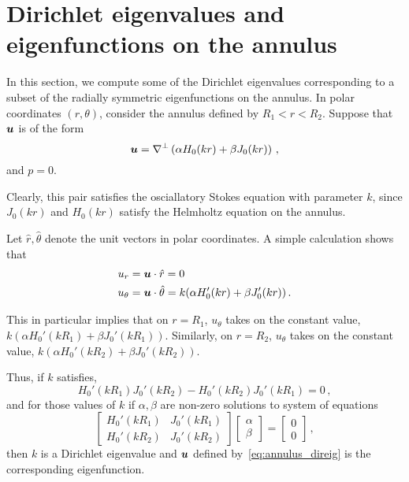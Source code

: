 \section{Dirichlet eigenvalues and eigenfunctions on the annulus \label{sec:annul_dir_exact}}
In this section, we compute some of the Dirichlet eigenvalues
corresponding to a subset of the radially symmetric eigenfunctions
on the annulus. 
In polar coordinates $(r,\theta)$, consider the annulus defined by 
$R_{1}<r<R_{2}$. 
Suppose that ${\boldsymbol u}$ is of the form 
\begin{equation}
{\boldsymbol u} = \nabla^{\perp}\left( \alpha H_{0}(kr) + \beta J_{0}(kr) \right) \, ,
\label{eq:annulus_direig}
\end{equation}
and $p=0$.

Clearly, this pair satisfies the osciallatory Stokes equation
with parameter $k$, since $J_{0}(kr)$ and $H_{0}(kr)$ 
satisfy the Helmholtz equation on the annulus.

Let $\hat{r},\hat{\theta}$ denote the unit vectors in polar coordinates.
A simple calculation shows that 
\begin{equation}
\begin{aligned}
u_{r} &= {\boldsymbol u} \cdot \hat{r}  = 0 \, \\
u_{\theta} &= {\boldsymbol u} \cdot \hat{\theta} = k(\alpha  H_{0}'(kr) + \beta J_{0}'(kr)) \, .
\end{aligned}
\end{equation}

This in particular implies that on $r=R_{1}$,
$u_{\theta}$ takes on the constant value,
$k(\alpha H_{0}'(kR_{1}) + \beta J_{0}'(kR_{1}))$.
Similarly, on $r=R_{2}$, 
$u_{\theta}$ takes on the constant value,
$k(\alpha H_{0}'(kR_{2}) + \beta J_{0}'(kR_{2}))$.

Thus, if $k$ satisfies, 
\begin{equation}
H_{0}'(kR_{1}) J_{0}'(kR_{2}) - H_{0}'(kR_{2})J_{0}'(kR_{1}) = 0 \, ,
\end{equation}
and for those values of $k$ if 
$\alpha,\beta$ are non-zero solutions to system of equations 
\begin{equation}
\begin{bmatrix}
H_{0}'(kR_1) & J_{0}'(kR_{1}) \\
H_{0}'(kR_{2}) & J_{0}'(kR_{2}) 
\end{bmatrix}
\begin{bmatrix}
\alpha \\
\beta
\end{bmatrix}
=
\begin{bmatrix}
0 \\
0
\end{bmatrix}
\, ,
\end{equation}
then $k$ is a Dirichlet eigenvalue and ${\boldsymbol u}$ 
defined by~\cref{eq:annulus_direig}
is the corresponding eigenfunction.

